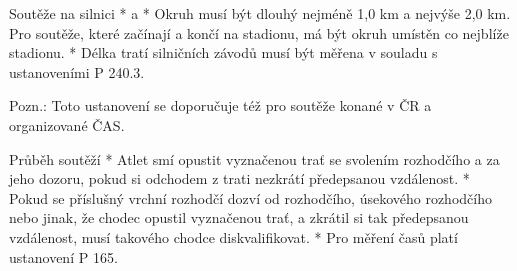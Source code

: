 Soutěže na silnici
* \begitems \style a
  * Okruh musí být dlouhý nejméně 1,0 km a nejvýše 2,0 km. Pro soutěže, které začínají a končí na stadionu, má být okruh umístěn co nejblíže stadionu.
  * Délka tratí silničních závodů musí být měřena v souladu s ustanoveními P 240.3.

  Pozn.: Toto ustanovení se doporučuje též pro soutěže konané v ČR a organizované ČAS.
  \enditems

Průběh soutěží
* Atlet smí opustit vyznačenou trať se svolením rozhodčího a za jeho dozoru, pokud si odchodem z trati nezkrátí předepsanou vzdálenost.
* Pokud se příslušný vrchní rozhodčí dozví od rozhodčího, úsekového rozhodčího nebo jinak, že chodec opustil vyznačenou trať, a zkrátil si tak předepsanou vzdálenost, musí takového chodce diskvalifikovat.
* Pro měření časů platí ustanovení P 165.
\enditems

\endinput